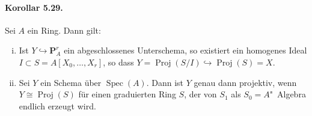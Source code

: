 \paragraph{Korollar 5.29.}\label{5.29} Sei $A$ ein Ring. Dann gilt:
\begin{enumerate}[(i)]
\item Ist $Y\hookrightarrow\mathbf{P}_A^r$ ein abgeschlossenes Unterschema, so existiert ein homogenes Ideal $I\subset S=A[X_0,\ldots,X_r]$, so dass $Y=\operatorname{Proj}(S/I)\hookrightarrow\operatorname{Proj}(S)=X$.
\item Sei $Y$ ein Schema über $\operatorname{Spec}(A)$. Dann ist $Y$ genau dann projektiv, wenn $Y\cong\operatorname{Proj}(S)$ für einen graduierten Ring $S$, der von $S_1$ als $S_0=A$"~Algebra endlich erzeugt wird.
\end{enumerate}

